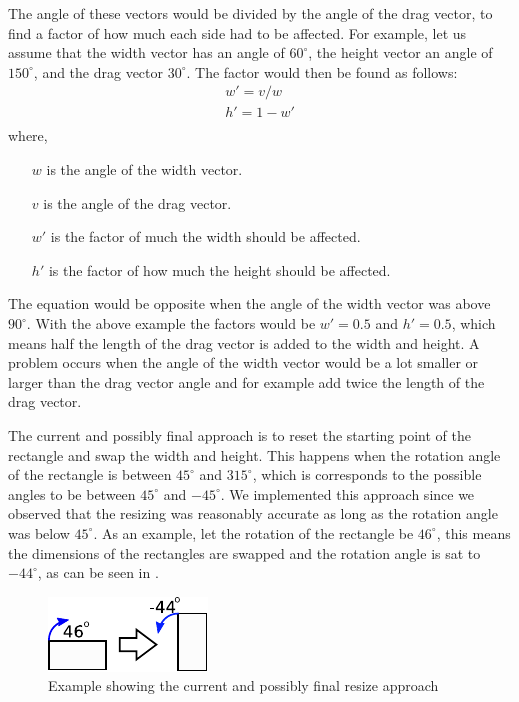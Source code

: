 The angle of these vectors would be divided by the angle of the drag vector, to find a factor of how much each side had to be affected.
For example, let us assume that the width vector has an angle of $60^\circ$, the height vector an angle of $150^\circ$, and the drag vector $30^\circ$.
The factor would then be found as follows:
\begin{equation}
\begin{aligned}
w' = v / w\\
h' = 1 - w'\\
\end{aligned}
\end{equation}
where, 
\begin{itemize}
\item[$w$] is the angle of the width vector.
\item[$v$] is the angle of the drag vector.
\item[$w'$] is the factor of much the width should be affected.
\item[$h'$] is the factor of how much the height should be affected.
\end{itemize}
The equation would be opposite when the angle of the width vector was above $90^\circ$.
With the above example the factors would be $w' = 0.5$ and $h' = 0.5$, which means half the length of the drag vector is added to the width and height.
A problem occurs when the angle of the width vector would be a lot smaller or larger than the drag vector angle and for example add twice the length of the drag vector.

The current and possibly final approach is to reset the starting point of the rectangle and swap the width and height.
This happens when the rotation angle of the rectangle is between $45^\circ$ and $315^\circ$, which is corresponds to the possible angles to be between $45^\circ$ and $-45^\circ$.
We implemented this approach since we observed that the resizing was reasonably accurate as long as the rotation angle was below $45^\circ$.
As an example, let the rotation of the rectangle be $46^\circ$, this means the dimensions of the rectangles are swapped and the rotation angle is sat to $-44^\circ$, as can be seen in .
\begin{figure}
\includegraphics[scale=0.5]{media/sprint3/approach6}
\caption{Example showing the current and possibly final resize approach}
\label{fig:app6}
\end{figure}
